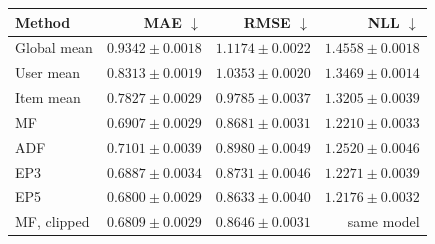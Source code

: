 \begin{tabular}{@{}lrrr@{}}
\toprule
Method & MAE $\downarrow$ & RMSE $\downarrow$ & NLL $\downarrow$ \\
\midrule
Global mean & $0.9342\pm0.0018$ & $1.1174\pm0.0022$ & $1.4558\pm0.0018$ \\
User mean & $0.8313\pm0.0019$ & $1.0353\pm0.0020$ & $1.3469\pm0.0014$ \\
Item mean & $0.7827\pm0.0029$ & $0.9785\pm0.0037$ & $1.3205\pm0.0039$ \\
MF & $0.6907\pm0.0029$ & $0.8681\pm0.0031$ & $1.2210\pm0.0033$ \\
ADF & $0.7101\pm0.0039$ & $0.8980\pm0.0049$ & $1.2520\pm0.0046$ \\
EP3 & $0.6887\pm0.0034$ & $0.8731\pm0.0046$ & $1.2271\pm0.0039$ \\
EP5 & $0.6800\pm0.0029$ & $0.8633\pm0.0040$ & $1.2176\pm0.0032$ \\
\midrule
MF, clipped & $0.6809\pm0.0029$ & $0.8646\pm0.0031$ & same model \\
\bottomrule
\end{tabular}
